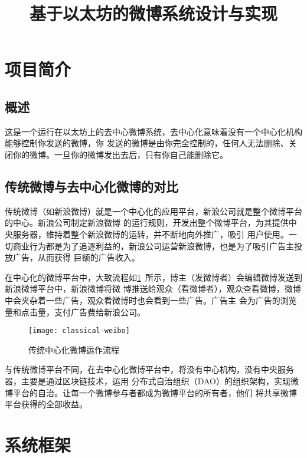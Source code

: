 \documentclass[bwprint]{hfutreport}
\title{基于以太坊的微博系统设计与实现}
\begin{document}
\maketitle

\pagestyle{plain}
\tableofcontents
\newpage
\pagestyle{plain}

\setcounter{page}{1}

\section{项目简介}
\subsection{概述}
这是一个运行在以太坊上的去中心微博系统，去中心化意味着没有一个中心化机构能够控制你发送的微博，你
发送的微博是由你完全控制的，任何人无法删除、关闭你的微博。一旦你的微博发出去后，只有你自己能删除它。

\subsection{传统微博与去中心化微博的对比}
传统微博（如新浪微博）就是一个中心化的应用平台，新浪公司就是整个微博平台的中心。新浪公司制定新浪微博
的运行规则，开发出整个微博平台，为其提供中央服务器，维持着整个新浪微博的运转，并不断地向外推广，吸引
用户使用。一切商业行为都是为了追逐利益的，新浪公司运营新浪微博，也是为了吸引广告主投放广告，从而获得
巨额的广告收入。

在中心化的微博平台中，大致流程如\cref{fig:classical-weibo}~所示，博主（发微博者）会编辑微博发送到新浪微博平台中，新浪微博将微
博推送给观众（看微博者），观众查看微博，微博中会夹杂着一些广告，观众看微博时也会看到一些广告。广告主
会为广告的浏览量和点击量，支付广告费给新浪公司。

\begin{figure}[!htbp]
    \texttt{[image: classical-weibo]}
    \caption{传统中心化微博运作流程}
    \label{fig:classical-weibo}
\end{figure}

与传统微博平台不同，在去中心化微博平台中，将没有中心机构，没有中央服务器，主要是通过区块链技术，运用
分布式自治组织（DAO）的组织架构，实现微博平台的自治。让每一个微博参与者都成为微博平台的所有者，他们
将共享微博平台获得的全部收益。

\section{系统框架}
\end{document}
